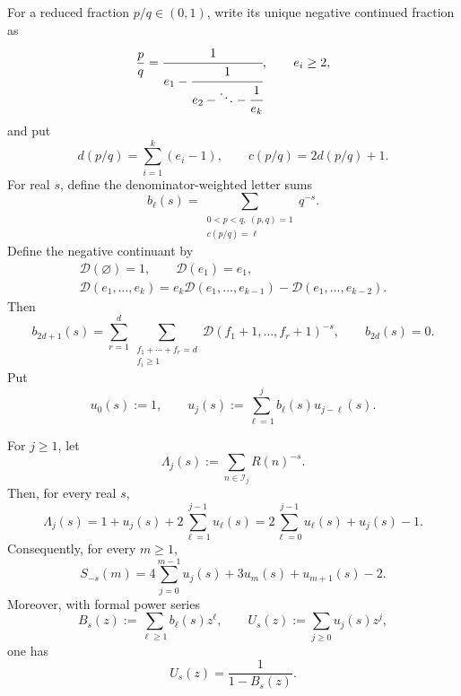 \ifdefined\supplementonly
\else
For a reduced fraction \(p/q\in(0,1)\), write its unique negative continued
fraction as
\[
 \frac pq=
 \cfrac1{e_1-\cfrac1{e_2-\ddots-\cfrac1{e_k}}},
 \qquad e_i\ge2,
\]
and put
\[
 d(p/q)=\sum_{i=1}^k(e_i-1),
 \qquad c(p/q)=2d(p/q)+1.
\]
For real \(s\), define the denominator-weighted letter sums
\[
 b_\ell(s)=
 \sum_{\substack{0<p<q,\ (p,q)=1\\c(p/q)=\ell}}q^{-s}.
\]
Define the negative continuant by
\[
 \begin{gathered}
  \mathcal D(\varnothing)=1,\qquad \mathcal D(e_1)=e_1,\\
  \mathcal D(e_1,\ldots,e_k)
  =e_k\mathcal D(e_1,\ldots,e_{k-1})
   -\mathcal D(e_1,\ldots,e_{k-2}).
 \end{gathered}
\]
Then
\begin{equation}
 b_{2d+1}(s)=
 \sum_{r=1}^d
 \sum_{\substack{f_1+\cdots+f_r=d\\f_i\ge1}}
 \mathcal D(f_1+1,\ldots,f_r+1)^{-s},
 \qquad b_{2d}(s)=0.
 \label{eq:weighted-letter-coefficients}
\end{equation}
Put
\begin{equation}
 u_0(s):=1,\qquad
 u_j(s):=\sum_{\ell=1}^j b_\ell(s)u_{j-\ell}(s).
 \label{eq:weighted-renewal-coefficients}
\end{equation}

\begin{proposition}
\label{prop:weighted-generator-renewal}
For \(j\ge1\), let
\[
 \Lambda_j(s):=\sum_{n\in\mathcal I_j}R(n)^{-s}.
\]
Then, for every real \(s\),
\begin{equation}
 \Lambda_j(s)
 =1+u_j(s)+2\sum_{\ell=1}^{j-1}u_\ell(s)
 =2\sum_{\ell=0}^{j-1}u_\ell(s)+u_j(s)-1.
 \label{eq:weighted-layer-renewal}
\end{equation}
Consequently, for every \(m\ge1\),
\begin{equation}
 S_{-s}(m)
 =4\sum_{j=0}^{m-1}u_j(s)+3u_m(s)+u_{m+1}(s)-2.
 \label{eq:weighted-window-renewal}
\end{equation}
Moreover, with formal power series
\[
 B_s(z):=\sum_{\ell\ge1}b_\ell(s)z^\ell,
 \qquad U_s(z):=\sum_{j\ge0}u_j(s)z^j,
\]
one has
\begin{equation}
 U_s(z)=\frac1{1-B_s(z)}.
 \label{eq:weighted-renewal-generating-function}
\end{equation}
\end{proposition}

